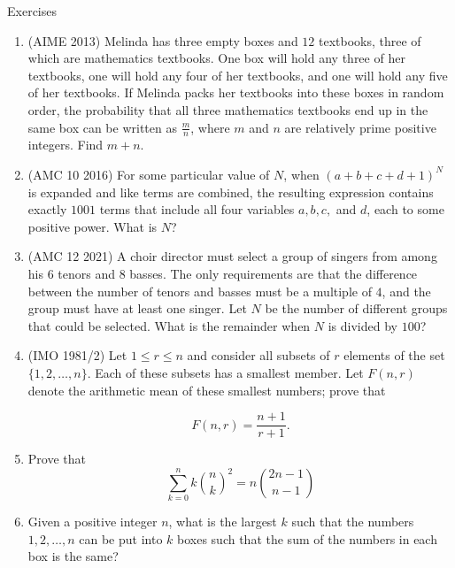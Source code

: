 \begin{xcb}{Exercises}
\begin{enumerate}
\item (AIME 2013)  Melinda has three empty boxes and $12$ textbooks, three of which are mathematics textbooks. One box will hold any three of her textbooks, one will hold any four of her textbooks, and one will hold any five of her textbooks. If Melinda packs her textbooks into these boxes in random order, the probability that all three mathematics textbooks end up in the same box can be written as $\frac{m}{n}$, where $m$ and $n$ are relatively prime positive integers. Find $m+n$.
\begin{hint}
\end{hint}
\item (AMC 10 2016)  For some particular value of $N$, when $(a + b + c + d + 1)^N$ is expanded and like terms are combined, the resulting expression contains exactly $1001$ terms that include all four variables $a, b, c,$ and $d$, each to some positive power. What is $N$?
\item (AMC 12 2021)  A choir director must select a group of singers from among his $6$ tenors and $8$ basses. The only requirements are that the difference between the number of tenors and basses must be a multiple of $4$, and the group must have at least one singer. Let $N$ be the number of different groups that could be selected. What is the remainder when $N$ is divided by $100$?
\begin{hint}
\end{hint}
\item (IMO 1981/2)  Let $\displaystyle 1 \le r \le n$ and consider all subsets of $\displaystyle r$ elements of the set $\{ 1, 2, \ldots , n \}$. Each of these subsets has a smallest member. Let $\displaystyle F(n,r)$ denote the arithmetic mean of these smallest numbers; prove that\par
\[F(n,r) = \frac{n+1}{r+1}.\]
\begin{hint}
\end{hint}
\item {} Prove that \[\sum_{k=0}^n k{\binom{n}{k}}^2=n\binom{2n-1}{n-1}\]
\item Given a positive integer $n$, what is the largest $k$ such that the numbers $1, 2, \dots , n$ can be put
into $k$ boxes such that the sum of the numbers in each box is the same?
\end{enumerate}
\end{xcb}